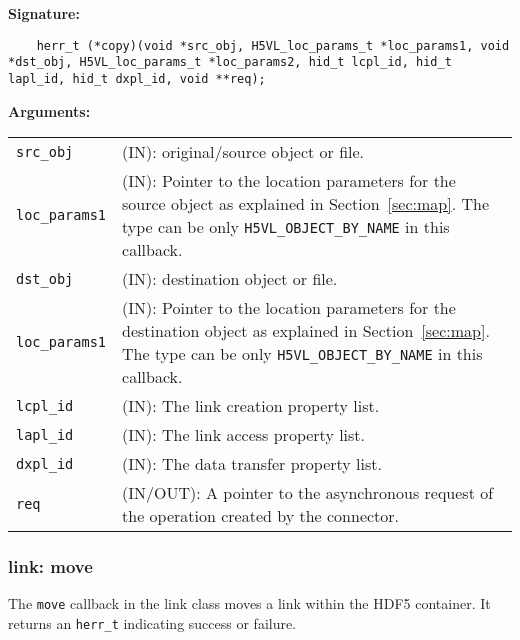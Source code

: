 \begin{mdframed}[style=bgbox]
\textbf{Signature:}
\begin{lstlisting}
    herr_t (*copy)(void *src_obj, H5VL_loc_params_t *loc_params1, void *dst_obj, H5VL_loc_params_t *loc_params2, hid_t lcpl_id, hid_t lapl_id, hid_t dxpl_id, void **req);
\end{lstlisting}

\textbf{Arguments:}\\
\begin{tabular}{l p{13.5cm}}
  \texttt{src\_obj} & (IN): original/source object or file. \\
  \texttt{loc\_params1} & (IN): Pointer to the location parameters for the source
  object as explained in Section~\ref{sec:map}. The type can be only \texttt{H5VL\_OBJECT\_BY\_NAME} in this callback. \\
  \texttt{dst\_obj} & (IN): destination object or file. \\
  \texttt{loc\_params1} & (IN): Pointer to the location parameters for the destination
  object as explained in Section~\ref{sec:map}. The type can be only \texttt{H5VL\_OBJECT\_BY\_NAME} in this callback. \\
  \texttt{lcpl\_id} & (IN): The link creation property list.\\
  \texttt{lapl\_id} & (IN): The link access property list.\\
  \texttt{dxpl\_id} & (IN): The data transfer property list.\\
  \texttt{req} & (IN/OUT): A pointer to the asynchronous request of the
  operation created by the connector.\\
\end{tabular}
\end{mdframed}

\subsubsection{link: move}
The \texttt{move} callback in the link class moves a link within the HDF5 container. It returns an \texttt{herr\_t} indicating success or failure.\bigskip

